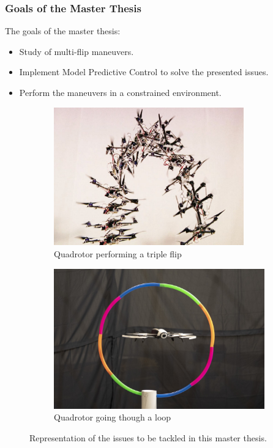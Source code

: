 \documentclass{thesisbeamer}
\newcommand\Fontvi{\fontsize{9}{10}\selectfont}
\begin{document}
\begin{frame}
\frametitle{Goals of the Master Thesis}
\Fontvi

The goals of the master thesis: 

\begin{itemize} %
	\item Study of multi-flip maneuvers.
	\item Implement Model Predictive Control to solve the presented issues.
	\item Perform the maneuvers in a constrained environment.
\end{itemize}

\begin{figure}[h]
     \centering
     \begin{subfigure}[h]{0.4\textwidth}
         \centering
         \includegraphics[width=0.9\textwidth]{Images/Introduction/flip}
    \caption{Quadrotor performing a triple flip\protect\footnotemark}
         \label{triple_flip}
     \end{subfigure}
     \hfill
     \begin{subfigure}[h]{0.38\textwidth}
         \centering
         \includegraphics[width=\textwidth]{Images/Introduction/constrained_environment}
         \caption[Caption for LOF]{Quadrotor going though a loop\protect\footnotemark}
         \label{drone_hulahoop}
     \end{subfigure}
        \caption{\tiny{Representation of the issues to be tackled in this master thesis.}}
        \label{fig:three graphs}
\end{figure}


\end{frame}
\end{document}
